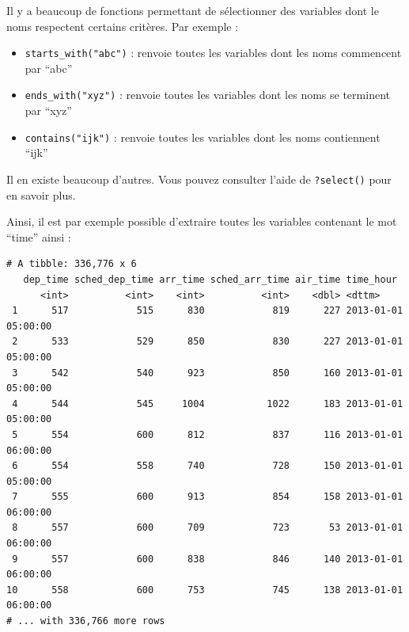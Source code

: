 \documentclass[a4paperpaper,]{article}
\newenvironment{Shaded}{\begin{snugshade}}{\end{snugshade}}
\newcommand{\KeywordTok}[1]{\textcolor[rgb]{0.13,0.29,0.53}{\textbf{#1}}}
\newcommand{\StringTok}[1]{\textcolor[rgb]{0.31,0.60,0.02}{#1}}
\newcommand{\OperatorTok}[1]{\textcolor[rgb]{0.81,0.36,0.00}{\textbf{#1}}}
\newcommand{\NormalTok}[1]{#1}
\providecommand{\tightlist}{%
  \setlength{\itemsep}{0pt}\setlength{\parskip}{0pt}}
\theoremstyle{definition}
\theoremstyle{definition}
\theoremstyle{definition}
\theoremstyle{remark}
\begin{document}
Il y a beaucoup de fonctions permettant de sélectionner des variables
dont le noms respectent certains critères. Par exemple :

\begin{itemize}
\tightlist
\item
  \texttt{starts\_with("abc")} : renvoie toutes les variables dont les
  noms commencent par ``abc''
\item
  \texttt{ends\_with("xyz")} : renvoie toutes les variables dont les
  noms se terminent par ``xyz''
\item
  \texttt{contains("ijk")} : renvoie toutes les variables dont les noms
  contiennent ``ijk''
\end{itemize}

Il en existe beaucoup d'autres. Vous pouvez consulter l'aide de
\texttt{?select()} pour en savoir plus.

Ainsi, il est par exemple possible d'extraire toutes les variables
contenant le mot ``time'' ainsi :

\begin{Shaded}
\end{Shaded}

\begin{verbatim}
# A tibble: 336,776 x 6
   dep_time sched_dep_time arr_time sched_arr_time air_time time_hour          
      <int>          <int>    <int>          <int>    <dbl> <dttm>             
 1      517            515      830            819      227 2013-01-01 05:00:00
 2      533            529      850            830      227 2013-01-01 05:00:00
 3      542            540      923            850      160 2013-01-01 05:00:00
 4      544            545     1004           1022      183 2013-01-01 05:00:00
 5      554            600      812            837      116 2013-01-01 06:00:00
 6      554            558      740            728      150 2013-01-01 05:00:00
 7      555            600      913            854      158 2013-01-01 06:00:00
 8      557            600      709            723       53 2013-01-01 06:00:00
 9      557            600      838            846      140 2013-01-01 06:00:00
10      558            600      753            745      138 2013-01-01 06:00:00
# ... with 336,766 more rows
\end{verbatim}
\end{document}
